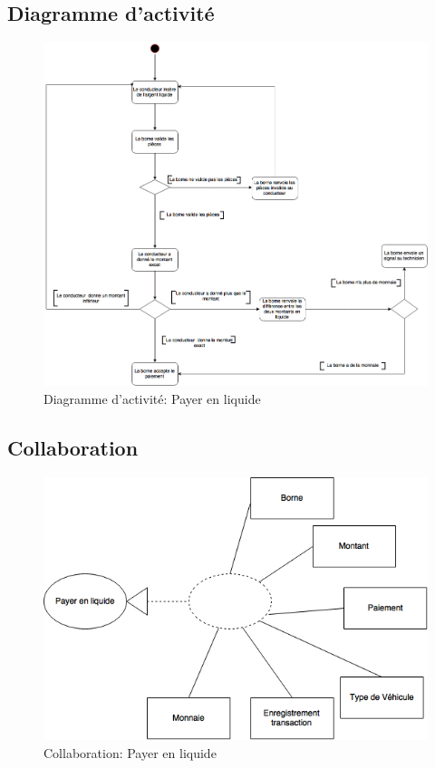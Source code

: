 \subsection{Diagramme d'activité}
\begin{figure}[h]
    \centering
    \includegraphics[scale=0.45]{02_Desenvolvimento/TD2/images/DAPayeLiquide.png}
    \caption{Diagramme d'activité: Payer en liquide}
\end{figure}
\newpage
\subsection{Collaboration}
\begin{figure}[h]
    \centering
    \includegraphics[scale=0.55]{02_Desenvolvimento/TD2/images/ColaLiquide.png}
    \caption{Collaboration: Payer en liquide}
\end{figure}